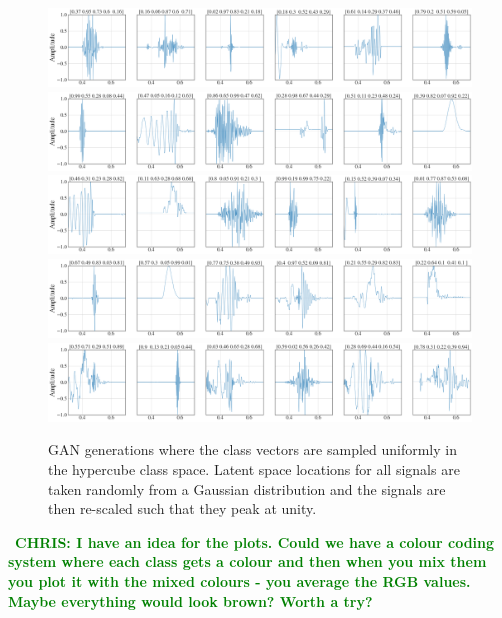 \documentclass[12pt]{iopart}
\newcommand{\chris}[1]{\textbf{\textcolor{green}{CHRIS: #1}}}
\begin{document}
\begin{figure}
    \centering
    \includegraphics[width=\textwidth]{figures/generations/uniform_sample1.png}
    \includegraphics[width=\textwidth]{figures/generations/uniform_sample2.png}
    \includegraphics[width=\textwidth]{figures/generations/uniform_sample3.png}
    \includegraphics[width=\textwidth]{figures/generations/uniform_sample4.png}
    \includegraphics[width=\textwidth]{figures/generations/uniform_sample5.png}
    \caption{GAN generations where the class vectors are sampled uniformly in the hypercube class space. Latent space locations for all signals are taken randomly from a Gaussian distribution and the signals are then re-scaled such that they peak at unity.}
    \label{fig:uniform_samples}
\end{figure}

~\chris{I have an idea for the plots. Could we have a colour coding system
where each class gets a colour and then when you mix them you plot it with the
mixed colours - you average the RGB values. Maybe everything would look brown?
Worth a try?}
\end{document}
